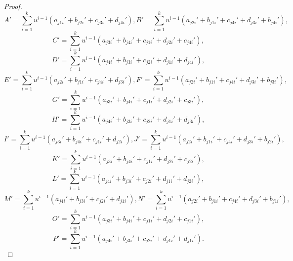 \documentclass{amsart}
\theoremstyle{definition}
\theoremstyle{remark}
\numberwithin{equation}{section}
\begin{document}
\begin{proof}
$$A' = \sum_{i=1}^{k}u^{i-1}(a_{j1i}'+b_{j2i}'+c_{j3i}'+d_{j4i}'),
B' = \sum_{i=1}^{k}u^{i-1}(a_{j2i}'+b_{j1i}'+c_{j4i}'+d_{j3i}'+b_{j4i}'),$$
$$C' = \sum_{i=1}^{k}u^{i-1}(a_{j3i}'+b_{j4i}'+c_{j1i}'+d_{j2i}'+c_{j4i}'),$$$$
D' = \sum_{i=1}^{k}u^{i-1}(a_{j4i}'+b_{j3i}'+c_{j2i}'+d_{j1i}'+d_{j4i}'),$$
$$E' = \sum_{i=1}^{k}u^{i-1}(a_{j2i}'+b_{j1i}'+c_{j4i}'+d_{j3i}'),
F' = \sum_{i=1}^{k}u^{i-1}(a_{j2i}'+b_{j1i}'+c_{j4i}'+d_{j3i}'+b_{j3i}'),$$
$$G' = \sum_{i=1}^{k}u^{i-1}(a_{j3i}'+b_{j4i}'+c_{j1i}'+d_{j2i}'+c_{j3i}'),$$$$
H' = \sum_{i=1}^{k}u^{i-1}(a_{j4i}'+b_{j3i}'+c_{j2i}'+d_{j1i}'+d_{j3i}'),$$
$$I' = \sum_{i=1}^{k}u^{i-1}(a_{j3i}'+b_{j4i}'+c_{j1i}'+d_{j2i}'), 
J' = \sum_{i=1}^{k}u^{i-1}(a_{j2i}'+b_{j1i}'+c_{j4i}'+d_{j3i}'+b_{j2i}'),$$
$$K' = \sum_{i=1}^{k}u^{i-1}(a_{j3i}'+b_{j4i}'+c_{j1i}'+d_{j2i}'+c_{j2i}'),
$$$$L' = \sum_{i=1}^{k}u^{i-1}(a_{j4i}'+b_{j3i}'+c_{j2i}'+d_{j1i}'+d_{j2i}'),$$
$$M' = \sum_{i=1}^{k}u^{i-1}(a_{j4i}'+b_{j3i}'+c_{j2i}'+d_{j1i}'),
N' = \sum_{i=1}^{k}u^{i-1}(a_{j2i}'+b_{j1i}'+c_{j4i}'+d_{j3i}'+b_{j1i}'),$$
$$O' = \sum_{i=1}^{k}u^{i-1}(a_{j3i}'+b_{j4i}'+c_{j1i}'+d_{j2i}'+c_{j1i}'),
$$$$P' = \sum_{i=1}^{k}u^{i-1}(a_{j4i}'+b_{j3i}'+c_{j2i}'+d_{j1i}'+d_{j1i}').$$



\end{proof}
\end{document}
